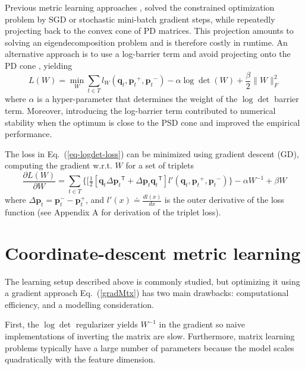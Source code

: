 \documentclass{article} %
\newcommand\mat[1]{{#1}}
\renewcommand\vec[1]{\mathbf{#1}}
\newcommand{\T}{{}^\mathsf{T}}
\newcommand{\W}{\mat{W}}
\newcommand{\eqdef}{\doteq}
\newcommand{\frobsq}[1]{{\|#1\|_F^2}}
\newcommand{\ignore}[1]{}
\newcommand{\q}{{\vec{q}}}
\newcommand{\p}{{\vec{p}}}
\newcommand{\trip}{{t}}
\newcommand{\qt}{{\q_{\trip}}}
\newcommand{\pt}{{\p_{\trip}}}
\newcommand{\triplet}{(\qt, \pt^{+}, \pt^{-})}
\renewcommand{\eqref}[1]{Eq.~(\ref{#1})}
\begin{document}
Previous metric learning approaches \cite{OASIS, qianHD, qian}, solved the constrained optimization problem by SGD or stochastic mini-batch gradient steps, while repeatedly projecting back to the convex cone of PD matrices. This projection amounts to solving an eigendecomposition problem and is therefore costly in runtime. An alternative approach is to use a log-barrier term and avoid projecting onto the PD cone \cite{davis2007information,lego}, yielding
\begin{equation}
\label{eq-logdet-loss}
L(W) = 
  \min_{\W} \sum_{\trip \in T}  l_{\W}(\qt, \pt^+, \pt^-) - \alpha \log \det(\W) + \frac{\beta}{2} \frobsq{\W}
\end{equation}
where $\alpha$ is a hyper-parameter that determines the weight of the
$\log \det$ barrier term. Moreover, introducing the log-barrier term contributed to numerical stability when the optimum is close to the PSD cone and improved the empirical performance.

The loss in \eqref{eq-logdet-loss} can be minimized using gradient descent (GD), computing the gradient w.r.t. $\W$ for a set of triplets
\begin{equation}
  \frac{\partial {L (\W)}}{\partial \W} = \sum\limits_{t\in T}{\{
  [\tfrac{1}{2}[\q_{t}\Delta\p_{t}\T + \Delta\p_{t}\q_{t}\T]  }
  {l'}\triplet\} - \alpha \W^{-1} + \beta \W
  \label{gradMtx}
\end{equation}
where $\Delta\p_t = \p_t^- - \p_t^+$, and $l'(x) \eqdef \frac{d{l(x)}}{dx}$ is the outer derivative of the loss function (see Appendix A for derivation of the triplet loss). 

\ignore{ For example, for the hinge-loss, 
$l'\triplet$ 
is an indicator function which obtains a value of $1$ if the loss is positive, and zero otherwise.}


\section{Coordinate-descent metric learning}

The learning setup described above is commonly studied, but 
optimizing it using a gradient approach \eqref{gradMtx} has two main drawbacks: computational efficiency, and a modelling consideration.

First, the $\log \det$ regularizer yields $\W^{-1}$ in the gradient so naive implementations of inverting the matrix are slow. Furthermore, matrix learning problems typically have a large number of parameters because the model scales quadratically with the feature dimension. %
\end{document}
